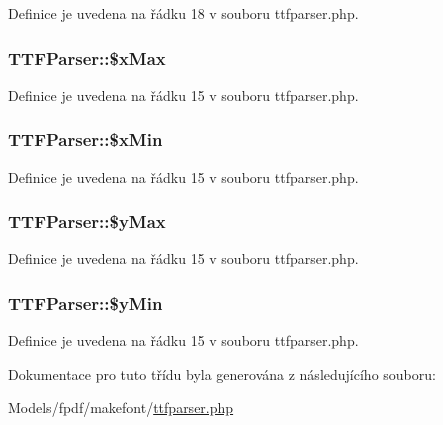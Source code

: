 Definice je uvedena na řádku 18 v souboru ttfparser.\-php.

\hypertarget{class_t_t_f_parser_a8dc1fa6634fad386dd721bda495dec93}{
\subsubsection[{\$x\-Max}]{\setlength{\rightskip}{0pt plus 5cm}T\-T\-F\-Parser\-::\$x\-Max}}\label{class_t_t_f_parser_a8dc1fa6634fad386dd721bda495dec93}


Definice je uvedena na řádku 15 v souboru ttfparser.\-php.

\hypertarget{class_t_t_f_parser_a0147f1450e3d775c89c1d50f531f1f54}{
\subsubsection[{\$x\-Min}]{\setlength{\rightskip}{0pt plus 5cm}T\-T\-F\-Parser\-::\$x\-Min}}\label{class_t_t_f_parser_a0147f1450e3d775c89c1d50f531f1f54}


Definice je uvedena na řádku 15 v souboru ttfparser.\-php.

\hypertarget{class_t_t_f_parser_ae3871bb9e3c31cb81fe616f4a59dbf19}{
\subsubsection[{\$y\-Max}]{\setlength{\rightskip}{0pt plus 5cm}T\-T\-F\-Parser\-::\$y\-Max}}\label{class_t_t_f_parser_ae3871bb9e3c31cb81fe616f4a59dbf19}


Definice je uvedena na řádku 15 v souboru ttfparser.\-php.

\hypertarget{class_t_t_f_parser_a4562aa6fe0656069fcaad452bce2772f}{
\subsubsection[{\$y\-Min}]{\setlength{\rightskip}{0pt plus 5cm}T\-T\-F\-Parser\-::\$y\-Min}}\label{class_t_t_f_parser_a4562aa6fe0656069fcaad452bce2772f}


Definice je uvedena na řádku 15 v souboru ttfparser.\-php.



Dokumentace pro tuto třídu byla generována z následujícího souboru\-:\begin{DoxyCompactItemize}
\item 
Models/fpdf/makefont/\hyperlink{ttfparser_8php}{ttfparser.\-php}\end{DoxyCompactItemize}
